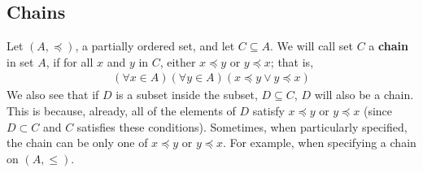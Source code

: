 \documentclass{tufte-handout} %
\theoremstyle{definition}
\theoremstyle{remark}
\begin{document}
\subsection{Chains}
Let $(A,\preccurlyeq)$, a partially ordered set, and let $C\subseteq A$. We will call set $C$ a \textbf{chain} in set $A$, if for all $x$ and $y$ in $C$, either $x\preccurlyeq y$ or $y \preccurlyeq x$; that is,
\begin{align*}
    (\forall x \in A)(\forall y \in A)(x\preccurlyeq y \vee y\preccurlyeq x)
\end{align*}
We also see that if $D$ is a subset inside the subset, $D\subseteq C$, $D$ will also be a chain. This is because, already, all of the elements of $D$ satisfy $x\preccurlyeq y$ or $y \preccurlyeq x$ (since $D\subset C$ and $C$ satisfies these conditions). Sometimes, when particularly specified, the chain can be only one of $x\preccurlyeq y$ or $y \preccurlyeq x$. For example, when specifying a chain on $(A, \leq)$.
\end{document}
